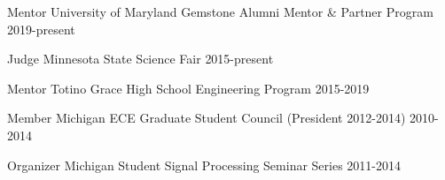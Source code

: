 

\begin{cvservices}


  \cvservice
    {Mentor} %
    {University of Maryland Gemstone Alumni Mentor \& Partner Program} %
    {} %
    {2019-present} %

  \cvservice
    {Judge} %
    {Minnesota State Science Fair} %
    {} %
    {2015-present} %

  \cvservice
    {Mentor} %
    {Totino Grace High School Engineering Program} %
    {} %
    {2015-2019} %

  \cvservice
    {Member} %
    {Michigan ECE Graduate Student Council (President 2012-2014)} %
    {} %
    {2010-2014} %

  \cvservice
    {Organizer} %
    {Michigan Student Signal Processing Seminar Series} %
    {} %
    {2011-2014} %

\end{cvservices}
